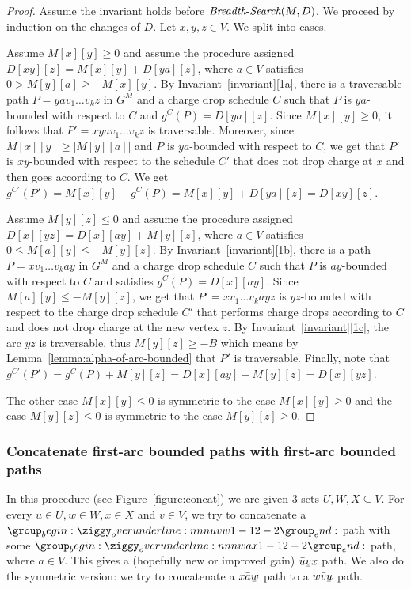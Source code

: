 \documentclass[11pt]{article}
\newcommand{\ubar}[1]{\underaccent{\bar}{{#1}}}
\newcommand{\BFS}{\mbox{{\it Breadth}-{\it Search}}}
\begin{document}
\begin{proof}
    Assume the invariant holds before $\BFS(M,D)$. We proceed by induction on the changes of $D$. Let $x,y,z\in V$. We split into cases.

    Assume $M[x][y]\ge 0$ and assume the procedure assigned $D[xy][z]=M[x][y]+D[ya][z]$, where $a\in V$ satisfies $0 > M[y][a] \ge  -M[x][y]$. By Invariant~\ref{invariant}\ref{1a}, there is a traversable path $P = ya v_1\ldots v_k z$ in $G^M$ and a charge drop schedule $C$ such that $P$ is $ya$-bounded with respect to $C$ and $g^C(P)= D[ya][z]$. Since $M[x][y]\ge 0$, it follows that $P' = xya v_1\ldots v_k z$ is traversable.  Moreover, since $M[x][y]\ge |M[y][a]|$ and $P$ is $ya$-bounded with respect to $C$, we get that $P'$ is $xy$-bounded with respect to the schedule $C'$ that does not drop charge at $x$ and then goes according to $C$. We get $g^{C'}(P') = M[x][y]+g^C(P) = M[x][y]+D[ya][z] = D[xy][z]$. 

    Assume $M[y][z]\le 0$ and assume the procedure assigned $D[x][yz]=D[x][ay]+M[y][z]$, where $a\in V$ satisfies $0 \le M[a][y] \le  -M[y][z]$. By Invariant~\ref{invariant}\ref{1b}, there is a path $P = x v_1\ldots v_k a y$ in $G^M$ and a charge drop schedule $C$ such that $P$ is $ay$-bounded with respect to $C$ and satisfies $g^C(P) = D[x][ay]$. Since $M[a][y] \le  -M[y][z]$, we get that $P'=x v_1\ldots v_k ayz$ is $yz$-bounded with respect to the charge drop schedule $C'$ that performs charge drops according to $C$ and does not drop charge at the new vertex $z$. By Invariant~\ref{invariant}\ref{1c}, the arc $yz$ is traversable, thus $M[y][z]\ge -B$ which means by Lemma~\ref{lemma:alpha-of-arc-bounded} that $P'$ is traversable. Finally, note that $g^{C'}(P')=g^{C}(P)+M[y][z] = D[x][ay] + M[y][z]=D[x][yz]$.
    
    The other case $M[x][y]\le 0$ is symmetric to the case $M[x][y]\ge 0$ and the case $M[y][z]\le 0$ is symmetric to the case $M[y][z]\ge 0$.
\end{proof}


\subsubsection{Concatenate first-arc bounded paths with first-arc bounded paths}\label{section:concatenate}
In this procedure (see Figure~\ref{figure:concat}) we are given $3$ sets $U,W,X\subseteq V$. For every $u\in U,w\in W,x\in X$ and $v\in V$, we try to concatenate a $\overunderline{uvw}{1-1}{2-2}$ path with some $\overunderline{wax}{1-1}{2-2}$ path, where $a \in V$.
This gives  a (hopefully new or improved gain) $\bar{u}\ubar{v}x$ path. 
We also do the symmetric version: we try to concatenate a $x\bar{a}\ubar{w}$ path to a $w\bar{v}\ubar{u}$ path. 
\end{document}
